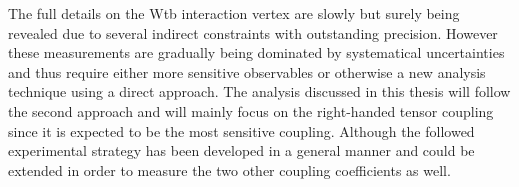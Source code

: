 The full details on the Wtb interaction vertex are slowly but surely being revealed due to several indirect constraints with outstanding precision. However these measurements are gradually being dominated by systematical uncertainties and thus require either more sensitive observables or otherwise a new analysis technique using a direct approach.
The analysis discussed in this thesis will follow the second approach and will mainly focus on the right-handed tensor coupling since it is expected to be the most sensitive coupling. Although the followed experimental strategy has been developed in a general manner and could be extended in order to measure the two other coupling coefficients as well.